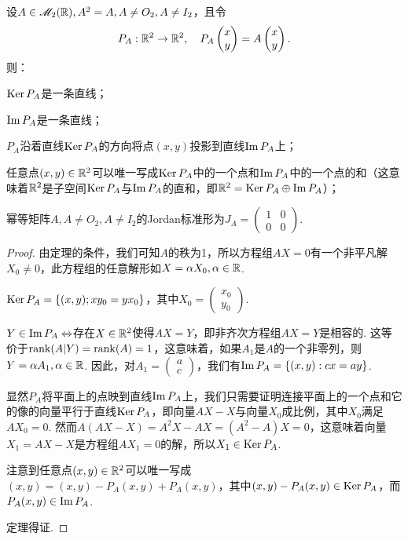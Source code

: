\begin{mybox}
  \begin{theorem}[投影的基本性质.]

    设$A\in\mathscr M_2(\mathbb R),A^2=A,A\ne O_2,A\ne I_2$，且令
    \[
      P_A : \mathbb R^2 \to \mathbb R^2,\quad P_A\begin{pmatrix}
        x \\
        y
      \end{pmatrix} =
      A\begin{pmatrix}
        x \\
        y
      \end{pmatrix}.
    \]
    则：
    \begin{enum}
      \item $\operatorname{Ker} P_A$是一条直线；
      \item $\operatorname{Im} P_A$是一条直线；
      \item $P_A$沿着直线$\operatorname{Ker} P_A$的方向将点$(x,y)$投影到直线$\operatorname{Im} P_A$上；
      \item 任意点$(x,y)\in\mathbb R^2$可以唯一写成$\operatorname{Ker} P_A$中的一个点和$\operatorname{Im} P_A$中的一个点的和（这意味着$\mathbb R^2$是子空间$\operatorname{Ker} P_A$与$\operatorname{Im} P_A$的直和，即$\mathbb R^2=\operatorname{Ker} P_A\oplus \operatorname{Im} P_A$）；
      \item 幂等矩阵$A,A\ne O_2,A\ne I_2$的Jordan标准形为$J_A=\begin{pmatrix}
            1 & 0 \\
            0 & 0
          \end{pmatrix}$.
    \end{enum}
  \end{theorem}
\end{mybox}
\begin{proof}
  由定理的条件，我们可知$A$的秩为1，所以方程组$AX=0$有一个非平凡解$X_0\ne0$，此方程组的任意解形如$X=\alpha X_0,\alpha\in\mathbb R$.
  \begin{enum}
    \item $\operatorname{Ker} P_A=\{(x,y);xy_0=yx_0\}$，其中$X_0=\begin{pmatrix}
          x_0 \\
          y_0
        \end{pmatrix}$.
    \item $Y\in\operatorname{Im} P_A\Leftrightarrow$存在$X\in\mathbb R^2$使得$AX=Y$，即非齐次方程组$AX=Y$是相容的. 这等价于$\operatorname{rank}(A|Y)=\operatorname{rank} (A)=1$，这意味着，如果$A_1$是$A$的一个非零列，则$Y=\alpha A_1,\alpha\in\mathbb R$. 因此，对$A_1=\begin{pmatrix}
          a \\ c
        \end{pmatrix}$，我们有$\operatorname{Im} P_A=\{(x,y):cx=ay\}$.
    \item 显然$P_A$将平面上的点映到直线$\operatorname{Im} P_A$上，我们只需要证明连接平面上的一个点和它的像的向量平行于直线$\operatorname{Ker} P_A$，即向量$AX-X$与向量$X_0$成比例，其中$X_0$满足$AX_0=0$. 然而$A(AX-X)=A^2X-AX=(A^2-A)X=0$，这意味着向量$X_1=AX-X$是方程组$AX_1=0$的解，所以$X_1\in\operatorname{Ker} P_A$.
    \item 注意到任意点$(x,y)\in\mathbb R^2$可以唯一写成$(x,y)=(x,y)-P_A(x,y)+P_A(x,y)$，其中$(x,y)-P_A(x,y)\in\operatorname{Ker} P_A$，而$P_A(x,y)\in\operatorname{Im} P_A$.
  \end{enum}
  定理得证.
\end{proof}

